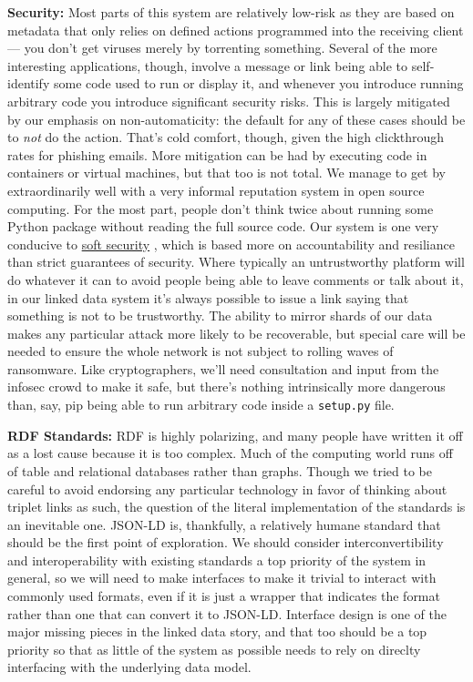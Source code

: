 \textbf{Security:} Most parts of this system are relatively low-risk as
they are based on metadata that only relies on defined actions
programmed into the receiving client --- you don't get viruses merely by
torrenting something. Several of the more interesting applications,
though, involve a message or link being able to self-identify some code
used to run or display it, and whenever you introduce running arbitrary
code you introduce significant security risks. This is largely mitigated
by our emphasis on non-automaticity: the default for any of these cases
should be to \emph{not} do the action. That's cold comfort, though,
given the high clickthrough rates for phishing emails. More mitigation
can be had by executing code in containers or virtual machines, but that
too is not total. We manage to get by extraordinarily well with a very
informal reputation system in open source computing. For the most part,
people don't think twice about running some Python package without
reading the full source code. Our system is one very conducive to
\href{http://meatballwiki.org/wiki/?SoftSecurity}{soft security} \citep{meatballwikiSoftSecurity} , which is based more on
accountability and resiliance than strict guarantees of security. Where
typically an untrustworthy platform will do whatever it can to avoid
people being able to leave comments or talk about it, in our linked data
system it's always possible to issue a link saying that something is not
to be trustworthy. The ability to mirror shards of our data makes any
particular attack more likely to be recoverable, but special care will
be needed to ensure the whole network is not subject to rolling waves of
ransomware. Like cryptographers, we'll need consultation and input from
the infosec crowd to make it safe, but there's nothing intrinsically
more dangerous than, say, pip being able to run arbitrary code inside a
\texttt{setup.py} file.

\textbf{RDF Standards:} RDF is highly polarizing, and many people have
written it off as a lost cause because it is too complex. Much of the
computing world runs off of table and relational databases rather than
graphs. Though we tried to be careful to avoid endorsing any particular
technology in favor of thinking about triplet links as such, the
question of the literal implementation of the standards is an inevitable
one. JSON-LD is, thankfully, a relatively humane standard that should be
the first point of exploration. We should consider interconvertibility
and interoperability with existing standards a top priority of the
system in general, so we will need to make interfaces to make it trivial
to interact with commonly used formats, even if it is just a wrapper
that indicates the format rather than one that can convert it to
JSON-LD. Interface design is one of the major missing pieces in the
linked data story, and that too should be a top priority so that as
little of the system as possible needs to rely on direclty interfacing
with the underlying data model.

